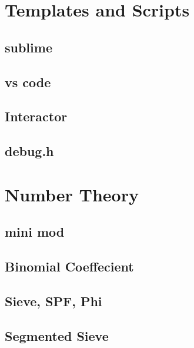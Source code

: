 \chapter{Templates and Scripts}
\section{sublime}


\section{vs code}


\section{Interactor}


\section{debug.h}


\chapter{Number Theory}
\section{mini mod}


\section{Binomial Coeffecient}


\section{Sieve, SPF, Phi}


\section{Segmented Sieve}


